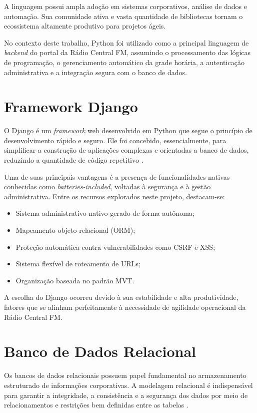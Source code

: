 \documentclass[12pt, openright, oneside, a4paper, brazil]{ads-unipac-abntex2}
\begin{document}
A linguagem possui ampla adoção em sistemas corporativos, análise de dados e automação. Sua comunidade ativa e vasta quantidade de bibliotecas tornam o ecossistema altamente produtivo para projetos ágeis.

No contexto deste trabalho, Python foi utilizado como a principal linguagem de \textit{backend} do portal da Rádio Central FM, assumindo o processamento das lógicas de programação, o gerenciamento automático da grade horária, a autenticação administrativa e a integração segura com o banco de dados.

\section{Framework Django}

O Django é um \textit{framework} web desenvolvido em Python que segue o princípio de desenvolvimento rápido e seguro. Ele foi concebido, essencialmente, para simplificar a construção de aplicações complexas e orientadas a banco de dados, reduzindo a quantidade de código repetitivo \cite{django}.

Uma de suas principais vantagens é a presença de funcionalidades nativas conhecidas como \textit{batteries-included}, voltadas à segurança e à gestão administrativa. Entre os recursos explorados neste projeto, destacam-se:

\begin{itemize}
    \item Sistema administrativo nativo gerado de forma autônoma;
    \item Mapeamento objeto-relacional (ORM);
    \item Proteção automática contra vulnerabilidades como CSRF e XSS;
    \item Sistema flexível de roteamento de URLs;
    \item Organização baseada no padrão MVT.
\end{itemize}

A escolha do Django ocorreu devido à sua estabilidade e alta produtividade, fatores que se alinham perfeitamente à necessidade de agilidade operacional da Rádio Central FM.

\section{Banco de Dados Relacional}

Os bancos de dados relacionais possuem papel fundamental no armazenamento estruturado de informações corporativas. A modelagem relacional é indispensável para garantir a integridade, a consistência e a segurança dos dados por meio de relacionamentos e restrições bem definidas entre as tabelas \cite{elmasri}.
\end{document}
